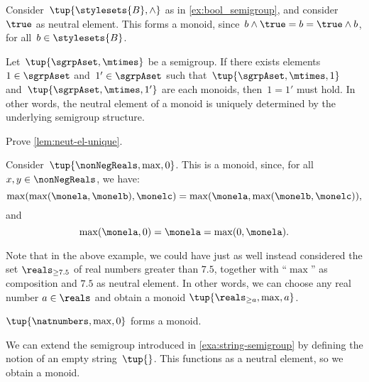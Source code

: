 \begin{example}
	\label{ex:bool_monoid}
	Consider~$\tup{\stylesets{B},\wedge}$ as in \cref{ex:bool_semigroup}, and consider~$\true$ as neutral element.
	This forms a monoid, since~$b\wedge \true=b=\true \wedge b$, for all~$b\in \stylesets{B}$.
\end{example}

\begin{lemma}
	\label{lem:neut-el-unique}
	Let~$\tup{\sgrpAset, \mtimes}$ be a semigroup.
	If there exists elements~$1 \in \sgrpAset$ and~$1' \in \sgrpAset$ such that~$\tup{\sgrpAset, \mtimes, 1}$ and~$\tup{\sgrpAset, \mtimes, 1'}$ are each monoids, then~$1 = 1'$ must hold.
	In other words, the neutral element of a monoid is uniquely determined by the underlying semigroup structure.
\end{lemma}

\begin{gradedexercise}
	\label{ex:UniqueNeutralMonoid}
	Prove \cref{lem:neut-el-unique}.
\end{gradedexercise}


\begin{example}
	Consider~$\tup{\nonNegReals,\max,0}$.
	This is a monoid, since, for all~$x,y\in \nonNegReals$, we have:
	\begin{equation*}
		\max(\max(\monela,\monelb),\monelc)=\max(\monela,\max(\monelb,\monelc)),
	\end{equation*}
	and
	\begin{equation*}
		\max(\monela,0)=\monela=\max(0,\monela).
	\end{equation*}
\end{example}

\begin{remark}
	Note that in the above example, we could have just as well instead considered the set $\reals_{\geq 7.5}$ of real numbers greater than $7.5$, together with ``$\max$'' as composition and $7.5$ as neutral element.
	In other words, we can choose any real number $a \in \reals$ and obtain a monoid $\tup{\reals_{\geq a},\max, a}$.
\end{remark}

\begin{example}
	$\tup{\natnumbers, \max,0}$ forms a monoid.
\end{example}

\begin{example}
	\label{exa:string-monoid}
	We can extend the semigroup introduced in \cref{exa:string-semigroup} by defining the notion of an empty string~$\tup{}$.
	This functions as a neutral element, so we obtain a monoid.
\end{example}

